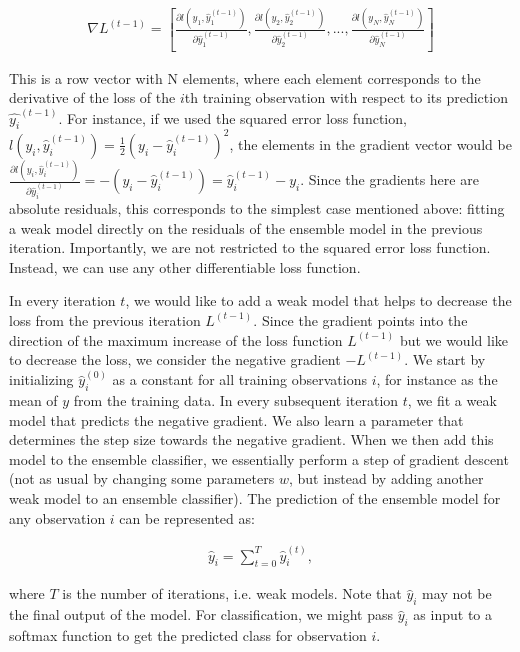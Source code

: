 \documentclass{article}
\begin{document}
	\begin{align}
		\nabla L^{(t-1)} = \left[\frac{\partial l(y_1, \hat{y}_1^{(t-1)})}{\partial \hat{y}_1^{(t-1)}}, \frac{\partial l(y_2, \hat{y}_2^{(t-1)})}{\partial \hat{y}_2^{(t-1)}}, ..., \frac{\partial l(y_N, \hat{y}_N^{(t-1)})}{\partial \hat{y}_N^{(t-1)}}\right]
	\end{align}
	
	This is a row vector with N elements, where each element corresponds to the derivative of the loss of the $i$th training observation with respect to its prediction $\hat{y_i}^{(t-1)}$. For instance, if we used the squared error loss function, $l(y_i, \hat{y}_i^{(t-1)}) = \frac{1}{2} \left(y_i - \hat{y}_i^{(t-1)}\right)^2$, the elements in the gradient vector would be $\frac{\partial l(y_i, \hat{y}_i^{(t-1)})}{\partial \hat{y}_i^{(t-1)}} = -\left(y_i - \hat{y}_i^{(t-1)}\right) = \hat{y}_i^{(t-1)} - y_i$. Since the gradients here are absolute residuals, this corresponds to the simplest case mentioned above: fitting a weak model directly on the residuals of the ensemble model in the previous iteration. Importantly, we are not restricted to the squared error loss function. Instead, we can use any other differentiable loss function.
	
	In every iteration $t$, we would like to add a weak model that helps to decrease the loss from the previous iteration $L^{(t-1)}$. Since the gradient points into the direction of the maximum increase of the loss function $L^{(t-1)}$ but we would like to decrease the loss, we consider the negative gradient $-L^{(t-1)}$.
	We start by initializing $\hat{y}_i^{(0)}$ as a constant for all training observations $i$, for instance as the mean of $y$ from the training data. In every subsequent iteration $t$, we fit a weak model that predicts the negative gradient. We also learn a parameter that determines the step size towards the negative gradient. When we then add this model to the ensemble classifier, we essentially perform a step of gradient descent (not as usual by changing some parameters $w$, but instead by adding another weak model to an ensemble classifier). The prediction of the ensemble model for any observation $i$ can be represented as:
	
	\begin{align}
	 \hat{y}_i = \sum_{t = 0}^T \hat{y}_i^{(t)}, 
	\end{align}
	
	where $T$ is the number of iterations, i.e. weak models. Note that $\hat{y}_i$ may not be the final output of the model. For classification, we might pass $\hat{y}_i$ as input to a softmax function to get the predicted class for observation $i$.
	
\end{document}
